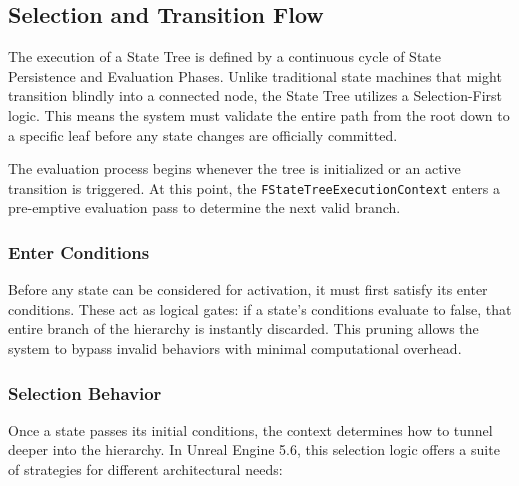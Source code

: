 \subsection{Selection and Transition Flow}

The execution of a State Tree is defined by a continuous cycle of State Persistence and Evaluation Phases. Unlike traditional state machines that might transition blindly into a connected node, the State Tree utilizes a Selection-First logic. This means the system must validate the entire path from the root down to a specific leaf before any state changes are officially committed.

The evaluation process begins whenever the tree is initialized or an active transition is triggered. At this point, the \texttt{FStateTreeExecutionContext} enters a pre-emptive evaluation pass to determine the next valid branch.

\subsubsection{Enter Conditions}

Before any state can be considered for activation, it must first satisfy its enter conditions. These act as logical gates: if a state’s conditions evaluate to false, that entire branch of the hierarchy is instantly discarded. This pruning allows the system to bypass invalid behaviors with minimal computational overhead.

\subsubsection{Selection Behavior}
Once a state passes its initial conditions, the context determines how to tunnel deeper into the hierarchy. In Unreal Engine 5.6, this selection logic offers a suite of strategies for different architectural needs:

